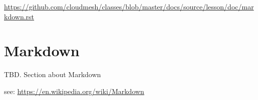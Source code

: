 \begin{fileremark}\url{https://github.com/cloudmesh/classes/blob/master/docs/source/lesson/doc/markdown.rst}\end{fileremark}
\section{Markdown}\label{markdown}

TBD. Section about Markdown

see: \url{https://en.wikipedia.org/wiki/Markdown}
